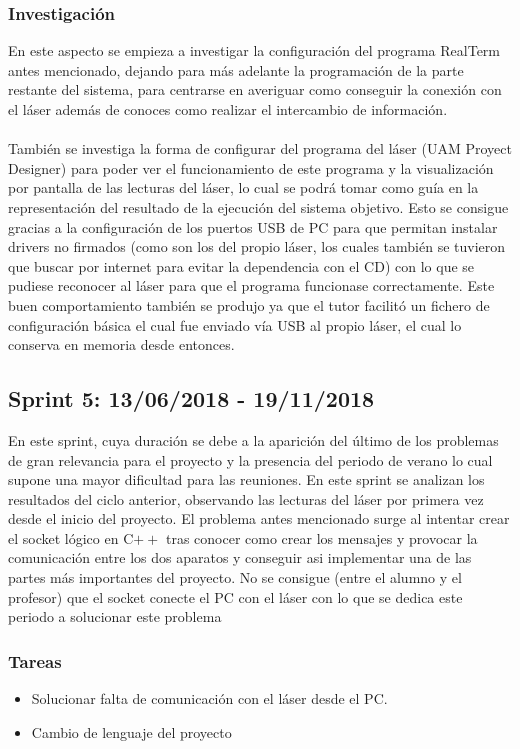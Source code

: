 \subsubsection{Investigación}
En este aspecto se empieza a investigar la configuración del programa RealTerm antes mencionado, dejando para más adelante la programación de la parte restante del sistema, para centrarse en averiguar como conseguir la conexión con el láser además de conoces como realizar el intercambio de información.\\
\\
También se investiga la forma de configurar del programa del láser (UAM Proyect Designer) para poder ver el funcionamiento de este programa y la visualización por pantalla de las lecturas del láser, lo cual se podrá tomar como guía en la representación del resultado de la ejecución del sistema objetivo. Esto se consigue gracias a la configuración de los puertos USB de PC para que permitan instalar drivers no firmados (como son los del propio láser, los cuales también se tuvieron que buscar por internet para evitar la dependencia con el CD) con lo que se pudiese reconocer al láser para que el programa funcionase correctamente. Este buen comportamiento también se produjo ya que el tutor facilitó un fichero de configuración básica el cual fue enviado vía USB al propio láser, el cual lo conserva en memoria desde entonces.
\subsection{Sprint 5: 13/06/2018 - 19/11/2018}
En este sprint, cuya duración se debe a la aparición del último de los problemas de gran relevancia para el proyecto y la presencia del periodo de verano lo cual supone una mayor dificultad para las reuniones. En este sprint se analizan los resultados del ciclo anterior, observando las lecturas del láser por primera vez desde el inicio del proyecto. El problema antes mencionado surge al intentar crear el socket lógico en C$++$ tras conocer como crear los mensajes y provocar la comunicación entre los dos aparatos y conseguir asi implementar una de las partes más importantes del proyecto. No se consigue (entre el alumno y el profesor) que el socket conecte el PC con el láser con lo que se dedica este periodo a solucionar este problema
\subsubsection{Tareas}
\begin{itemize}
	\item Solucionar falta de comunicación con el láser desde el PC.
	\item Cambio de lenguaje del proyecto
\end{itemize}
